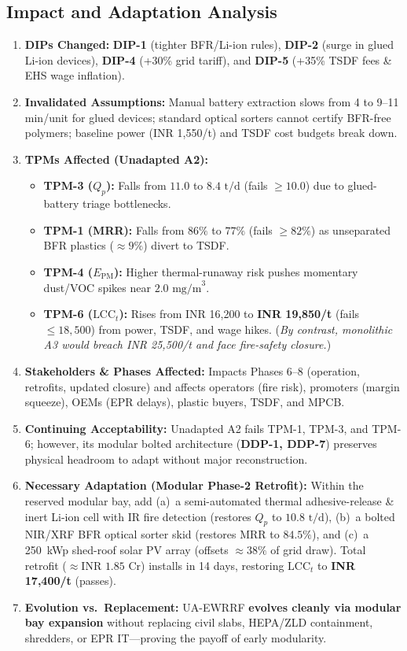 \subsection{Impact and Adaptation Analysis}
\begin{enumerate}
    \item \textbf{DIPs Changed:} \textbf{DIP-1} (tighter BFR/Li-ion rules), \textbf{DIP-2} (surge in glued Li-ion devices), \textbf{DIP-4} (+30\% grid tariff), and \textbf{DIP-5} (+35\% TSDF fees \& EHS wage inflation).
    \item \textbf{Invalidated Assumptions:} Manual battery extraction slows from 4 to 9--11 min/unit for glued devices; standard optical sorters cannot certify BFR-free polymers; baseline power (INR 1,550/t) and TSDF cost budgets break down.
    \item \textbf{TPMs Affected (Unadapted A2):}
    \begin{itemize}
        \item \textbf{TPM-3 ($Q_p$):} Falls from $11.0$ to \textbf{$8.4\text{ t/d}$} (\textcolor{CrimsonRisk}{fails $\ge 10.0$}) due to glued-battery triage bottlenecks.
        \item \textbf{TPM-1 (MRR):} Falls from $86\%$ to \textbf{$77\%$} (\textcolor{CrimsonRisk}{fails $\ge 82\%$}) as unseparated BFR plastics ($\approx 9\%$) divert to TSDF.
        \item \textbf{TPM-4 ($E_{\text{PM}}$):} Higher thermal-runaway risk pushes momentary dust/VOC spikes near $2.0\text{ mg/m}^3$.
        \item \textbf{TPM-6 ($\text{LCC}_t$):} Rises from INR 16,200 to \textbf{INR 19,850/t} (\textcolor{CrimsonRisk}{fails $\le 18{,}500$}) from power, TSDF, and wage hikes. (\textit{By contrast, monolithic A3 would breach INR 25,500/t and face fire-safety closure.})
    \end{itemize}
    \item \textbf{Stakeholders \& Phases Affected:} Impacts Phases 6--8 (operation, retrofits, updated closure) and affects operators (fire risk), promoters (margin squeeze), OEMs (EPR delays), plastic buyers, TSDF, and MPCB.
    \item \textbf{Continuing Acceptability:} Unadapted A2 fails TPM-1, TPM-3, and TPM-6; however, its modular bolted architecture (\textbf{DDP-1, DDP-7}) preserves physical headroom to adapt without major reconstruction.
    \item \textbf{Necessary Adaptation (Modular Phase-2 Retrofit):} Within the reserved modular bay, add (a)~a semi-automated thermal adhesive-release \& inert Li-ion cell with IR fire detection (restores $Q_p$ to $10.8\text{ t/d}$), (b)~a bolted NIR/XRF BFR optical sorter skid (restores MRR to $84.5\%$), and (c)~a 250~kWp shed-roof solar PV array (offsets $\approx 38\%$ of grid draw). Total retrofit ($\approx\text{INR } 1.85\text{ Cr}$) installs in 14 days, restoring $\text{LCC}_t$ to \textbf{INR 17,400/t} (\textcolor{TealAccent}{passes}).
    \item \textbf{Evolution vs.\ Replacement:} UA-EWRRF \textbf{evolves cleanly via modular bay expansion} without replacing civil slabs, HEPA/ZLD containment, shredders, or EPR IT---proving the payoff of early modularity.
\end{enumerate}
